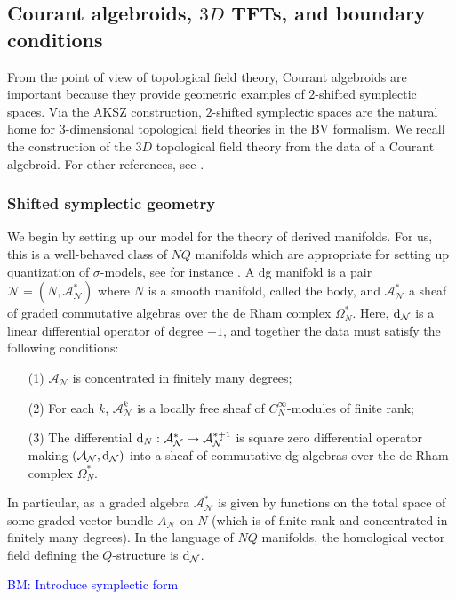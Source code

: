 \documentclass[letterpaper,12pt]{article}
\newcommand{\cN}{\mathcal{N}}
\newcommand{\sA}{\mathcal{A}}
\def\d{{\rm d}}
\theoremstyle{definition}
\theoremstyle{remark}
\theoremstyle{examples}
\def\brian{\textcolor{blue}{BM: }\textcolor{blue}}
\begin{document}
\subsection{Courant algebroids, $3D$ TFTs, and boundary conditions}


From the point of view of topological field theory, Courant algebroids are important because they provide geometric examples of $2$-shifted symplectic spaces. 
Via the AKSZ construction, $2$-shifted symplectic spaces are the natural home for $3$-dimensional topological field theories in the BV formalism. 
We recall the construction of the $3D$ topological field theory from the data of a Courant algebroid. 
For other references, see \cite{Roytenberg:2002nu, Cattaneo:2009zx}. 

\subsubsection{Shifted symplectic geometry} 
\label{sec: dgman}

We begin by setting up our model for the theory of derived manifolds. 
For us, this is a well-behaved class of $NQ$ manifolds which are appropriate for setting up quantization of $\sigma$-models, see for instance \cite{CostelloSUSY}. 
A dg manifold is a pair $\cN = (N, \sA^*_\cN)$ where $N$ is a smooth manifold, called the body, and $\sA^*_\cN$ a sheaf of graded commutative algebras over the de Rham complex $\Omega^*_N$.
Here, $\d_\cN$ is a linear differential operator of degree $+1$, and together the data must satisfy the following conditions:
\begin{itemize}
\item[(1)] $\sA_\cN$ is concentrated in finitely many degrees;
\item[(2)] For each $k$, $\sA^k_\cN$ is a locally free sheaf of $C^\infty_N$-modules of finite rank;
\item[(3)] The differential $\d_N : \sA_\cN^* \to \sA_\cN^{*+1}$ is square zero differential operator making $(\sA_\cN , \d_\cN)$ into a sheaf of commutative dg algebras over the de Rham complex $\Omega^*_N$.
\end{itemize}

In particular, as a graded algebra $\sA^*_\cN$ is given by functions on the total space of some graded vector bundle $A_\cN$ on $N$ (which is of finite rank and concentrated in finitely many degrees). 
In the language of $NQ$ manifolds, the homological vector field defining the $Q$-structure is $\d_\cN$. 

\brian{Introduce symplectic form}
\end{document}
